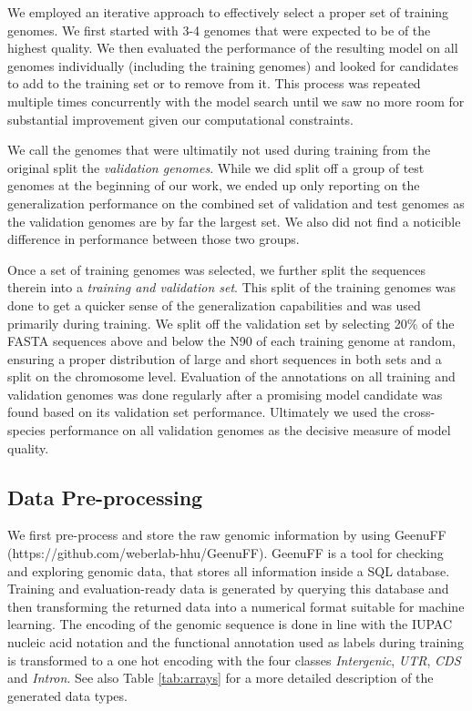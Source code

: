 \documentclass{bioinfo}
\begin{document}
\begin{methods}
We employed an iterative approach to effectively select a proper set of training 
genomes. We first started with 3-4 genomes that were expected to be of the 
highest quality. We then evaluated the performance of the resulting model on all 
genomes individually (including the training genomes) and looked for candidates to 
add to the training set or to remove from it. This process was repeated multiple 
times concurrently with the model search until we saw no more room for substantial 
improvement given our computational constraints.

We call the genomes that were ultimatily not used during training from the original 
split the {\it validation genomes}. While we did split off a group of test genomes 
at the beginning of our work, we ended up only reporting on the generalization 
performance on the combined set of validation and test genomes as the validation 
genomes are by far the largest set. We also did not find a noticible difference in 
performance between those two groups. 

Once a set of training genomes was selected, we further split the sequences therein into a {\it 
training and validation set}. This split of the training genomes was done to get a 
quicker sense of the generalization capabilities and was used primarily during 
training. We split off the validation set by selecting 20\% of the FASTA sequences 
above and below the N90 of each training genome at random, ensuring a proper distribution of 
large and short sequences in both sets and a split on the chromosome level. 
Evaluation of the annotations on all training and validation genomes was done 
regularly after a promising model candidate was found based on its validation set 
performance. Ultimately we used the cross-species performance on all 
validation genomes as the decisive measure of model quality.

\subsection{Data Pre-processing}
We first pre-process and store the raw genomic information by using GeenuFF 
(https://github.com/weberlab-hhu/GeenuFF). 
GeenuFF is a tool for checking and exploring genomic data, that 
stores all information inside a SQL database. Training and evaluation-ready data is 
generated by querying this database and then transforming the returned data into a 
numerical format suitable for machine learning. The encoding of the genomic sequence 
is done in line with the IUPAC nucleic acid notation and the functional annotation 
used as labels during training is transformed to a one hot encoding with the four 
classes {\it Intergenic}, {\it UTR}, {\it CDS} and {\it Intron}. See also Table 
\ref{tab:arrays} for a more detailed description of the generated data types.


\end{methods}
\end{document}
